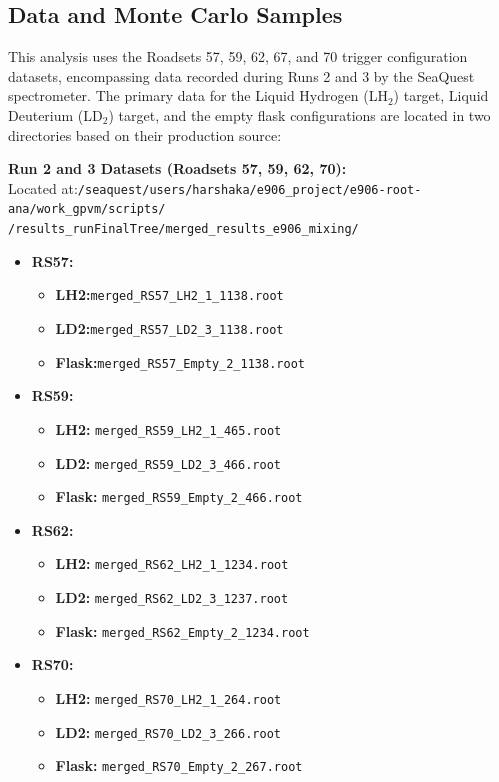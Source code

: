\documentclass[11pt]{article}
\begin{document}
\subsection{Data and Monte Carlo Samples}
This analysis uses the Roadsets 57, 59, 62, 67, and 70 trigger configuration datasets, encompassing data recorded during Runs 2 and 3 by the SeaQuest spectrometer.
\clearpage
The primary data for the Liquid Hydrogen (LH$_2$) target, Liquid Deuterium (LD$_2$) target, and the empty flask configurations are located in two directories based on their production source:

\vspace{0.2cm}
\noindent \textbf{Run 2 and 3 Datasets (Roadsets 57, 59, 62, 70):} \\
Located at:\texttt{/seaquest/users/harshaka/e906\_project/e906-root-ana/work\_gpvm/scripts/\\/results\_runFinalTree/merged\_results\_e906\_mixing/}
\begin{itemize}
    \item \textbf{RS57:}
        \begin{itemize}
            \item \textbf{LH2:}\texttt{merged\_RS57\_LH2\_1\_1138.root} 
            \item \textbf{LD2:}\texttt{merged\_RS57\_LD2\_3\_1138.root}
            \item \textbf{Flask:}\texttt{merged\_RS57\_Empty\_2\_1138.root}
        \end{itemize}
    \item \textbf{RS59:} 
        \begin{itemize}
            \item \textbf{LH2:} \texttt{merged\_RS59\_LH2\_1\_465.root}
            \item \textbf{LD2:} \texttt{merged\_RS59\_LD2\_3\_466.root}
            \item \textbf{Flask:} \texttt{merged\_RS59\_Empty\_2\_466.root}
        \end{itemize}
    \item \textbf{RS62:}
        \begin{itemize}
            \item \textbf{LH2:} \texttt{merged\_RS62\_LH2\_1\_1234.root}
            \item \textbf{LD2:} \texttt{merged\_RS62\_LD2\_3\_1237.root}
            \item \textbf{Flask:} \texttt{merged\_RS62\_Empty\_2\_1234.root}
        \end{itemize}
    \item \textbf{RS70:} 
        \begin{itemize}
            \item \textbf{LH2:} \texttt{merged\_RS70\_LH2\_1\_264.root}
            \item \textbf{LD2:} \texttt{merged\_RS70\_LD2\_3\_266.root}
            \item \textbf{Flask:} \texttt{merged\_RS70\_Empty\_2\_267.root}
        \end{itemize}
\end{itemize}
\end{document}
